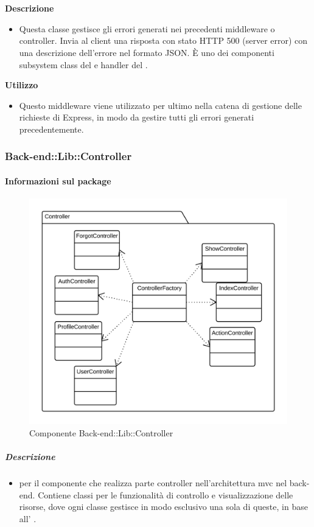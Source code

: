         \textbf{\\ \\ Descrizione} 
          \begin{itemize}
            \item[] Questa classe gestisce gli errori generati nei precedenti middleware o controller. Invia al client una risposta con stato HTTP 500 (server error) con una descrizione dell'errore nel formato JSON.
È uno dei componenti subsystem class del   e handler del  .
          \end{itemize}      
        \textbf{Utilizzo}  
          \begin{itemize}
            \item[] Questo middleware viene utilizzato per ultimo nella catena di gestione delle richieste di Express, in modo da gestire tutti gli errori generati precedentemente.
          \end{itemize}
  \subsubsection{Back-end::Lib::Controller}
  \paragraph{Informazioni sul package} 
    \begin{figure}[H] 
      \begin{center} 
        \includegraphics[width=\textwidth]{packages/Back-end::Lib::Controller.png}  
        \caption{Componente Back-end::Lib::Controller}
      \end{center}  
    \end{figure} 
  \subparagraph{Descrizione} 
    \begin{itemize}
    \item[]  per il componente che realizza parte controller nell'architettura mvc nel back-end. Contiene classi per le funzionalità di controllo e visualizzazione delle risorse, dove ogni classe gestisce in modo esclusivo una sola di queste, in base all' .
    \end{itemize} 
